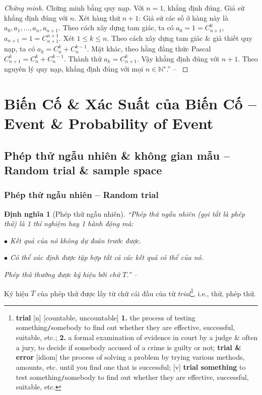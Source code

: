\documentclass[oneside]{book}
\numberwithin{equation}{section}
\newtheorem{dinhnghia}{Định nghĩa}[section]
\begin{document}
\begin{proof}[Chứng minh]
	Chứng minh bằng quy nạp. Với $n = 1$, khẳng định đúng. Giả sử khẳng định đúng với $n$. Xét hàng thứ $n + 1$: Giả sử các số ở hàng này là $a_0,a_1,\ldots,a_n,a_{n+1}$. Theo cách xây dựng tam giác, ta có $a_0 = 1 = C_{n+1}^0$, $a_{n+1} = 1 = C_{n+1}^{n+1}$. Xét $1\le k\le n$. Theo cách xây dựng tam giác \& giả thiết quy nạp, ta có $a_k = C_n^k + C_n^{k-1}$. Mặt khác, theo hằng đẳng thức Pascal $C_{n+1}^k = C_n^k + C_n^{k-1}$. Thành thử $a_k = C_{n+1}^k$. Vậy khẳng định đúng với $n + 1$. Theo nguyên lý quy nạp, khẳng định đúng với mọi $n\in\mathbb{N}^\star$.'' -- \cite[pp. 93--94]{TL_chuyen_Toan_Dai_So_Giai_Tich_11}
\end{proof}


\section{Biến Cố \& Xác Suất của Biến Cố -- Event \& Probability of Event}

\subsection{Phép thử ngẫu nhiên \& không gian mẫu -- Random trial \& sample space}

\subsubsection{Phép thử ngẫu nhiên -- Random trial}

\begin{dinhnghia}[Phép thử ngẫu nhiên]
	``\emph{Phép thử ngẫu nhiên} (gọi tắt là \emph{phép thử}) là 1 thí nghiệm hay 1 hành động mà:
	\begin{enumerate*}
		\item[$\bullet$] Kết quả của nó không dự đoán trước được.
		\item[$\bullet$] Có thể xác định được tập hợp tất cả các kết quả có thể của nó.
	\end{enumerate*}
	Phép thử thường được ký hiệu bởi chữ $T$.'' -- \cite[p. 95]{TL_chuyen_Toan_Dai_So_Giai_Tich_11}
\end{dinhnghia}
Ký hiệu $T$ của phép thử được lấy từ chữ cái đầu của từ \textit{trial}\footnote{\textbf{trial} [n] [countable, uncountable] \textbf{1.} the process of testing something\texttt{/}somebody to find out whether they are effective, successful, suitable, etc.; \textbf{2.} a formal examination of evidence in court by a judge \& often a jury, to decide if somebody accused of a crime is guilty or not; \textbf{trial \& error} [idiom] the process of solving a problem by trying various methods, amounts, etc. until you find one that is successful; [v] \textbf{trial something} to test something\texttt{/}somebody to find out whether they are effective, successful, suitable, etc.}, i.e., thử, phép thử.
\end{document}
